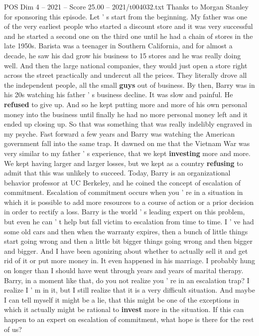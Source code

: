 \begin{textsample}{POS Dim 4 – 2021 – Score 25.00 – 2021/t004032.txt}
Thanks to Morgan Stanley for sponsoring this episode.
Let ' s start from the beginning.
My father was one of the very earliest people who started a discount store and it was very successful and he started a second one on the third one until he had a chain of stores in the late 1950s.
Barista was a teenager in Southern California, and for almost a decade, he saw his dad grow his business to 15 stores and he was really doing well.
And then the large national companies, they would just open a store right across the street practically and undercut all the prices.
They literally drove all the independent people, all the small \textbf{guys} out of business.
By then, Barry was in his 20s watching his father ' s business decline.
It was slow and painful.
He \textbf{refused} to give up.
And so he kept putting more and more of his own personal money into the business until finally he had no more personal money left and it ended up closing up.
So that was something that was really indelibly engraved in my psyche.
Fast forward a few years and Barry was watching the American government fall into the same trap.
It dawned on me that the Vietnam War was very similar to my father ' s experience, that we kept \textbf{investing} more and more.
We kept having larger and larger losses, but we kept as a country \textbf{refusing} to admit that this was unlikely to succeed.
Today, Barry is an organizational behavior professor at UC Berkeley, and he coined the concept of escalation of commitment.
Escalation of commitment occurs when you ' re in a situation in which it is possible to add more resources to a course of action or a prior decision in order to rectify a loss.
Barry is the world ' s leading expert on this problem, but even he can ' t help but fall victim to escalation from time to time.
I ' ve had some old cars and then when the warranty expires, then a bunch of little things start going wrong and then a little bit bigger things going wrong and then bigger and bigger.
And I have been agonizing about whether to actually sell it and get rid of it or put more money in.
It even happened in his marriage.
I probably hung on longer than I should have went through years and years of marital therapy.
Barry, in a moment like that, do you not realize you ' re in an escalation trap?
I realize I ' m in it, but I still realize that it is a very difficult situation.
And maybe I can tell myself it might be a lie, that this might be one of the exceptions in which it actually might be rational to \textbf{invest} more in the situation.
If this can happen to an expert on escalation of commitment, what hope is there for the rest of us?

\end{textsample}
